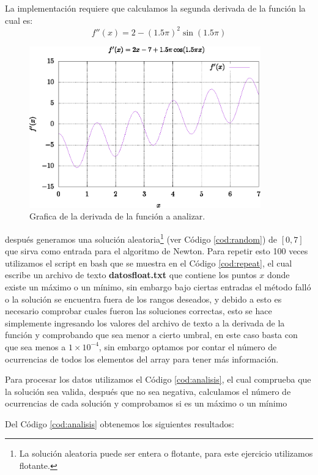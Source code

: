 \documentclass[10pt,a4paper]{article}
\begin{document}
La implementación requiere que calculamos la segunda derivada de la función la cual es:
\begin{equation}
f''(x) = 2 - (1.5 \pi)^{2} \sin(1.5 \pi)
\end{equation}
\begin{figure}[ht!]
\centering
\includegraphics[width=10cm]{grafica2.eps}
\caption{Grafica de la derivada de la función a analizar.}
\label{fig:g2}
\end{figure}
después generamos una solución aleatoria\footnote{La solución aleatoria puede ser entera o flotante, para este ejercicio utilizamos flotante.} (ver Código \ref{cod:random}) de $[0,7]$ que sirva como entrada para el algoritmo de Newton. Para repetir esto 100 veces utilizamos el script en bash que se muestra en el Código \ref{cod:repeat}, el cual escribe un archivo de texto \textbf{datosfloat.txt} que contiene los puntos $x$ donde existe un máximo o un mínimo, sin embargo bajo ciertas entradas el método falló o la solución se encuentra fuera de los rangos deseados, y debido a esto es necesario comprobar cuales fueron las soluciones correctas, esto se hace simplemente ingresando los valores del archivo de texto a la derivada de la función y comprobando que sea menor a cierto umbral, en este caso basta con que sea menos a $1 \times 10^{-4}$, sin embargo optamos por contar el número de ocurrencias de todos los elementos del array para tener más información.

Para procesar los datos utilizamos el Código \ref{cod:analisis}, el cual comprueba que la solución sea valida, después que no sea negativa, calculamos el número de ocurrencias de cada solución y comprobamos si es un máximo o un mínimo 

Del Código \ref{cod:analisis} obtenemos los siguientes resultados:
\end{document}
